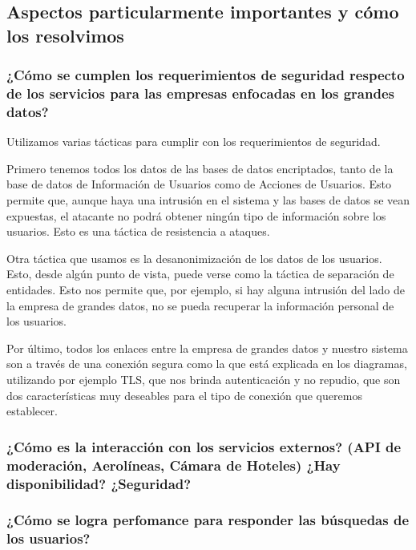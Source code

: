 \subsection{Aspectos particularmente importantes y cómo los resolvimos}

\subsubsection{¿Cómo se cumplen los requerimientos de seguridad respecto de los servicios para las empresas enfocadas en los grandes datos?}

Utilizamos varias tácticas para cumplir con los requerimientos de seguridad.

Primero tenemos todos los datos de las bases de datos encriptados, tanto de la base de datos de Información de Usuarios como de Acciones de Usuarios. Esto permite que, aunque haya una intrusión en el sistema y las bases de datos se vean expuestas, el atacante no podrá obtener ningún tipo de información sobre los usuarios. Esto es una táctica de resistencia a ataques.

Otra táctica que usamos es la desanonimización de los datos de los usuarios. Esto, desde algún punto de vista, puede verse como la táctica de separación de entidades. Esto nos permite que, por ejemplo, si hay alguna intrusión del lado de la empresa de grandes datos, no se pueda recuperar la información personal de los usuarios.

Por último, todos los enlaces entre la empresa de grandes datos y nuestro sistema son a través de una conexión segura como la que está explicada en los diagramas, utilizando por ejemplo TLS, que nos brinda autenticación y no repudio, que son dos características muy deseables para el tipo de conexión que queremos establecer.

\subsubsection{¿Cómo es la interacción con los servicios externos? (API de moderación, Aerolíneas, Cámara de Hoteles) ¿Hay disponibilidad? ¿Seguridad?}

\subsubsection{¿Cómo se logra perfomance para responder las búsquedas de los usuarios?}
